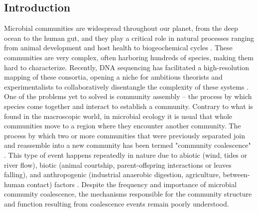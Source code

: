 \documentclass[titlepage,11pt]{article}
\begin{document}
\begin{linenumbers}
		\section{Introduction}
			Microbial communities are widespread throughout our planet, from the deep ocean to the human gut, and they play a critical role in natural processes ranging from animal development and host health \citep{Huttenhower2012} to biogeochemical cycles \citep{Falkowski2008}. These communities are very complex, often harboring hundreds of species, making them hard to characterize. Recently, DNA sequencing has facilitated a high-resolution mapping of these consortia, opening a niche for ambitious theorists and experimentalists to collaboratively disentangle the complexity of these systems \citep{Marsland2019, Goldford2018, Goyal2018, Friedman2017, Costello2012}. One of the problems yet to solved is community assembly -- the process by which species come together and interact to establish a community. Contrary to what is found in the macroscopic world, in microbial ecology it is usual that whole communities move to a region where they encounter another community. The process by which two or more communities that were previously separated join and reassemble into a new community has been termed "community coalescence" \citep{Rillig2015}. This type of event happens repeatedly in nature due to abiotic (wind, tides or river flow), biotic (animal courtship, parent-offspring interactions or leaves falling), and anthropogenic (industrial anaerobic digestion, agriculture, between-human contact) factors \citep{Castledine2020}. Despite the frequency and importance of microbial community coalescence, the mechanisms responsible for the community structure and function resulting from coalescence events remain poorly understood.\\

\end{linenumbers}
\end{document}
